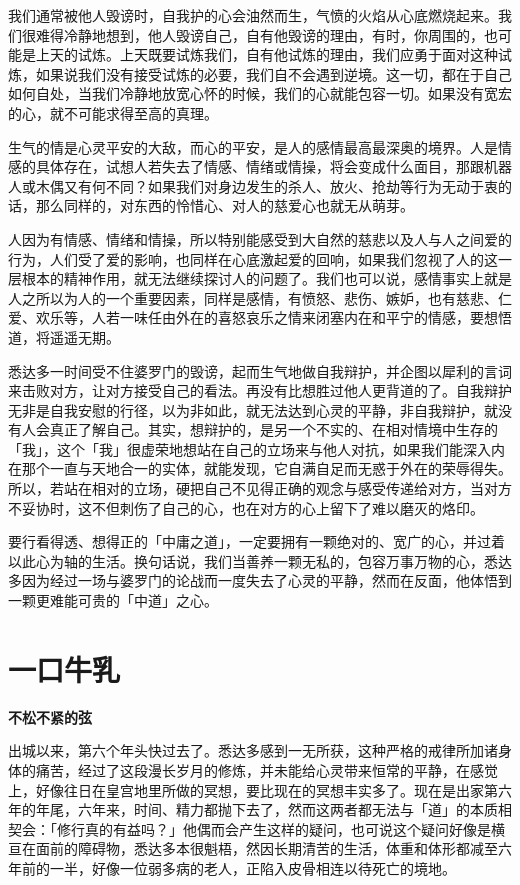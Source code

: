 \documentclass[twoside,openany]{book}
\newcommand{\mt}[1]{\textbullet \textbf{#1}}
\begin{document}
我们通常被他人毁谤时，自我护的心会油然而生，气愤的火焰从心底燃烧起来。我们很难得冷静地想到，他人毁谤自己，自有他毁谤的理由，有时，你周围的，也可能是上天的试炼。上天既要试炼我们，自有他试炼的理由，我们应勇于面对这种试炼，如果说我们没有接受试炼的必要，我们自不会遇到逆境。这一切，都在于自己如何自处，当我们冷静地放宽心怀的时候，我们的心就能包容一切。如果没有宽宏的心，就不可能求得至高的真理。

生气的情是心灵平安的大敌，而心的平安，是人的感情最高最深奥的境界。人是情感的具体存在，试想人若失去了情感、情绪或情操，将会变成什么面目，那跟机器人或木偶又有何不同？如果我们对身边发生的杀人、放火、抢劫等行为无动于衷的话，那么同样的，对东西的怜惜心、对人的慈爱心也就无从萌芽。

人因为有情感、情绪和情操，所以特别能感受到大自然的慈悲以及人与人之间爱的行为，人们受了爱的影响，也同样在心底激起爱的回响，如果我们忽视了人的这一层根本的精神作用，就无法继续探讨人的问题了。我们也可以说，感情事实上就是人之所以为人的一个重要因素，同样是感情，有愤怒、悲伤、嫉妒，也有慈悲、仁爱、欢乐等，人若一味任由外在的喜怒哀乐之情来闭塞内在和平宁的情感，要想悟道，将遥遥无期。

悉达多一时间受不住婆罗门的毁谤，起而生气地做自我辩护，并企图以犀利的言词来击败对方，让对方接受自己的看法。再没有比想胜过他人更背道的了。自我辩护无非是自我安慰的行径，以为非如此，就无法达到心灵的平静，非自我辩护，就没有人会真正了解自己。其实，想辩护的，是另一个不实的、在相对情境中生存的「我」，这个「我」很虚荣地想站在自己的立场来与他人对抗，如果我们能深入内在那个一直与天地合一的实体，就能发现，它自满自足而无惑于外在的荣辱得失。所以，若站在相对的立场，硬把自己不见得正确的观念与感受传递给对方，当对方不妥协时，这不但刺伤了自己的心，也在对方的心上留下了难以磨灭的烙印。

要行看得透、想得正的「中庸之道」，一定要拥有一颗绝对的、宽广的心，并过着以此心为轴的生活。换句话说，我们当善养一颗无私的，包容万事万物的心，悉达多因为经过一场与婆罗门的论战而一度失去了心灵的平静，然而在反面，他体悟到一颗更难能可贵的「中道」之心。

\section{一口牛乳}\label{sec1.9}

\mt{不松不紧的弦}

出城以来，第六个年头快过去了。悉达多感到一无所获，这种严格的戒律所加诸身体的痛苦，经过了这段漫长岁月的修炼，并未能给心灵带来恒常的平静，在感觉上，好像往日在皇宫地里所做的冥想，要比现在的冥想丰实多了。现在是出家第六年的年尾，六年来，时间、精力都抛下去了，然而这两者都无法与「道」的本质相契会：「修行真的有益吗？」他偶而会产生这样的疑问，也可说这个疑问好像是横亘在面前的障碍物，悉达多本很魁梧，然因长期清苦的生活，体重和体形都减至六年前的一半，好像一位弱多病的老人，正陷入皮骨相连以待死亡的境地。
\end{document}
